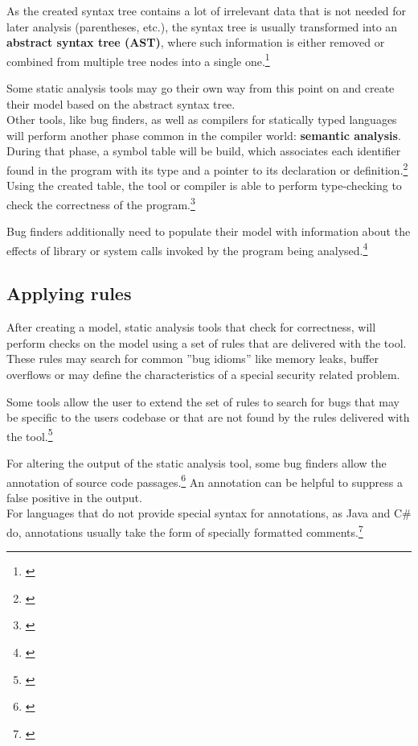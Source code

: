 As the created syntax tree contains a lot of irrelevant data that is not needed for later analysis (parentheses, etc.), the syntax tree is usually transformed into an \textbf{abstract syntax tree (AST)}, where such information is either removed or combined from multiple tree nodes into a single one.\footnote{\citep[99]{CompilerBasics}}

Some static analysis tools may go their own way from this point on and create their model based on the abstract syntax tree.\\Other tools, like bug finders, as well as compilers for statically typed languages will perform another phase common in the compiler world: \textbf{semantic analysis}. During that phase, a symbol table will be build, which associates each identifier found in the program with its type and a pointer to its declaration or definition.\footnote{\citep[76]{SecureProgramming}} Using the created table, the tool or compiler is able to perform type-checking to check the correctness of the program.\footnote{\citep[76]{SecureProgramming}}

Bug finders additionally need to populate their model with information about the effects of library or system calls invoked by the program being analysed.\footnote{\citep[37]{SecureProgramming}}

\subsection{Applying rules}

After creating a model, static analysis tools that check for correctness, will perform checks on the model using a set of rules that are delivered with the tool. These rules may search for common ''bug idioms'' like memory leaks, buffer overflows or may define the characteristics of a special security related problem.

Some tools allow the user to extend the set of rules to search for bugs that may be specific to the users codebase or that are not found by the rules delivered with the tool.\footnote{\citep[97]{SecureProgramming}}

For altering the output of the static analysis tool, some bug finders allow the annotation of source code passages.\footnote{\citep[99]{SecureProgramming}} An annotation can be helpful to suppress a false positive in the output.
\\For languages that do not provide special syntax for annotations, as Java and C\# do, annotations usually
take the form of specially formatted comments.\footnote{\citep[99]{SecureProgramming}}

